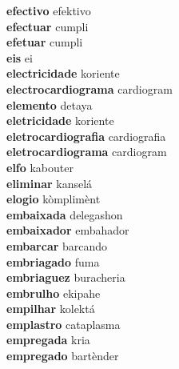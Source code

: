 \textbf{efectivo } efektivo \\
\textbf{efectuar } cumpli \\
\textbf{efetuar } cumpli \\
\textbf{eis } ei \\
\textbf{electricidade } koriente \\
\textbf{electrocardiograma } cardiogram \\
\textbf{elemento } detaya \\
\textbf{eletricidade } koriente \\
\textbf{eletrocardiografia } cardiografia \\
\textbf{eletrocardiograma } cardiogram \\
\textbf{elfo } kabouter \\
\textbf{eliminar } kanselá \\
\textbf{elogio } kòmplimènt \\
\textbf{embaixada } delegashon \\
\textbf{embaixador } embahador \\
\textbf{embarcar } barcando \\
\textbf{embriagado } fuma \\
\textbf{embriaguez } buracheria \\
\textbf{embrulho } ekipahe \\
\textbf{empilhar } kolektá \\
\textbf{emplastro } cataplasma \\
\textbf{empregada } kria \\
\textbf{empregado } bartènder \\
